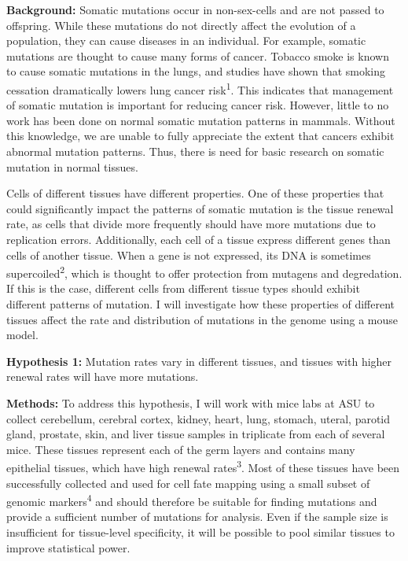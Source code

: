 \documentclass[12pt]{article}
\begin{document}
\noindent
\textbf{Background:}
Somatic mutations occur in non-sex-cells and are not passed to offspring.
While these mutations do not directly affect the evolution of a population, they can cause diseases in an individual.
For example, somatic mutations are thought to cause many forms of cancer.
Tobacco smoke is known to cause somatic mutations in the lungs, and studies have shown that smoking cessation dramatically lowers lung cancer risk\textsuperscript{1}.
This indicates that management of somatic mutation is important for reducing cancer risk.
However, little to no work has been done on normal somatic mutation patterns in mammals.
Without this knowledge, we are unable to fully appreciate the extent that cancers exhibit abnormal mutation patterns.
Thus, there is need for basic research on somatic mutation in normal tissues.

Cells of different tissues have different properties.
One of these properties that could significantly impact the patterns of somatic mutation is the tissue renewal rate, as cells that divide more frequently should have more mutations due to replication errors.
Additionally, each cell of a tissue express different genes than cells of another tissue.
When a gene is not expressed, its DNA is sometimes supercoiled\textsuperscript{2}, which is thought to offer protection from mutagens and degredation.
If this is the case, different cells from different tissue types should exhibit different patterns of mutation.
I will investigate how these properties of different tissues affect the rate and distribution of mutations in the genome using a mouse model.

\textbf{Hypothesis 1:}
Mutation rates vary in different tissues, and tissues with higher renewal rates will have more mutations.

\textbf{Methods:}
To address this hypothesis, I will work with mice labs at ASU to collect cerebellum, cerebral cortex, kidney, heart, lung, stomach, uteral, parotid gland, prostate, skin, and liver tissue samples in triplicate from each of several mice. These tissues represent each of the germ layers and contains many epithelial tissues, which have high renewal rates\textsuperscript{3}.
Most of these tissues have been successfully collected and used for cell fate mapping using a small subset of genomic markers\textsuperscript{4} and should therefore be suitable for finding mutations and provide a sufficient number of mutations for analysis. Even if the sample size is insufficient for tissue-level specificity, it will be possible to pool similar tissues to improve statistical power.
\end{document}
